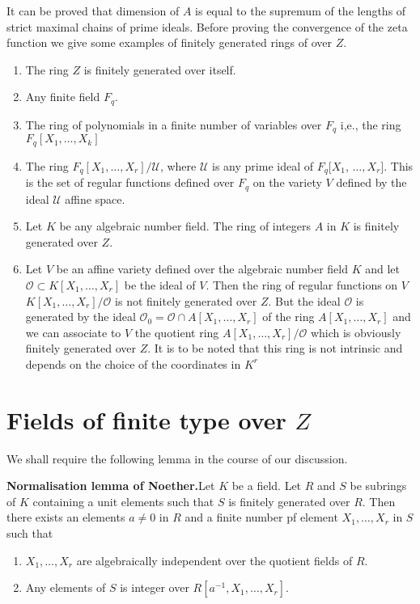 It can be proved that dimension of $A$ is equal to the supremum of the
lengths of strict maximal chains of prime ideals. Before proving the
convergence of the zeta function we give some examples of finitely
generated rings of over $Z$. 
\begin{enumerate}
\item The ring $Z$ is finitely generated over itself. 
\item Any finite field $F_q$.
\item The ring of polynomials in a finite number of variables over
  $F_q$ i,e., the ring  $F_q [ X_1,  \ldots,  X_k ]$ 
\item The ring $F_q [ X_1,  \ldots,  X_r ] / \mathscr{U}$, where
  $\mathscr{U}$ is any prime ideal of  $F_q [ X_1$,  $\ldots,  X_r
]$. This is the set of regular functions defined over $F_q$ on the
  variety $V$ defined by the ideal $\mathscr{U}$ affine space. 
\item Let $K$ be any algebraic number field.  The ring  of integers
  $A$ in $K$ is finitely generated  over $Z$. 
\item Let $V$ be an affine variety defined over the algebraic number
  field $K$ and let  $\mathscr{O} \subset K [ X_1,  \ldots,  X_r ]$ be
  the ideal of $V$. Then the ring of regular functions on $V$ \iec  $K
  [ X_1,  \ldots,  X_r ] / \mathscr{O}$ is not finitely generated
  over $Z$. But the ideal $\mathscr{O}$ is generated by the ideal
  $\mathscr{O}_0 = \mathscr{O} \cap A [ X_1,  \ldots,  X_r ]$ of the
  ring  $A [ X_1,  \ldots,  X_r ]$ and we can associate to $V$ the
  quotient ring $A [ X_1,  \ldots,  X_r ] / \mathscr{O}$ which is
  obviously finitely generated over $Z$. It is to be noted that this
  ring is not intrinsic and depends on the choice of the coordinates
  in $K^r$ 
\end{enumerate}

\section{Fields of finite type over $Z$}\label{part3:chap2:sec2}

We shall require the following lemma in the course of our discussion. 
 
\noindent 
\textbf{Normalisation lemma of Noether.}\pageoriginale Let $K$ be a field. Let $R$
and $S$ be subrings of $K$ containing a unit elements such that $S$ is
finitely generated over $R$. Then there exists an elements $a \neq 0$
in $R$ and a finite number pf element $X_1, \ldots,  X_r$ in $S$ such
that 
\begin{enumerate}
\item $X_1,  \ldots,  X_r$ are algebraically independent over the
  quotient fields of $R$.  
\item  Any elements  of $S$ is integer over $R[ a^{-1}, X_1,  \ldots, 
  X_r ]$. 
\end{enumerate} 
 
